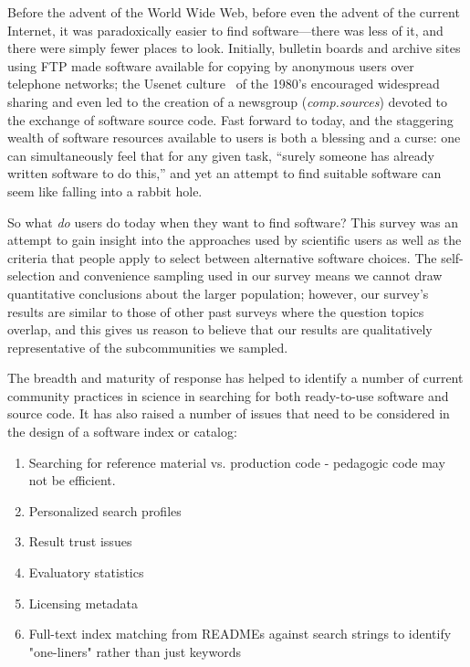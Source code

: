 \documentclass{casicswhitepaper}
\begin{document}
Before the advent of the World Wide Web, before even the advent of the current Internet, it was paradoxically easier to find software---there was less of it, and there were simply fewer places to look.  Initially, bulletin boards and archive sites using FTP made software available for copying by anonymous users over telephone networks; the Usenet culture~\cite{emerson1983usenet} of the 1980's encouraged widespread sharing and even led to the creation of a newsgroup (\emph{comp.sources}) devoted to the exchange of software source code.  Fast forward to today, and the staggering wealth of software resources available to users is both a blessing and a curse: one can simultaneously feel that for any given task, ``surely someone has already written software to do this,'' and yet an attempt to find suitable software can seem like falling into a rabbit hole.

%

So what \emph{do} users do today when they want to find software?  This survey was an attempt to gain insight into the approaches used by scientific users as well as the criteria that people apply to select between alternative software choices.  The self-selection and convenience sampling used in our survey means we cannot draw quantitative conclusions about the larger population; however, our survey's results are similar to those of other past surveys where the question topics overlap, and this gives us reason to believe that our results are qualitatively representative of the subcommunities we sampled.

The breadth and maturity of response has helped to identify a number of current community practices in science in searching for both ready-to-use software and source code. It has also raised a number of issues that need to be considered in the design of a software index or catalog:

\begin{enumerate}
\item Searching for reference material vs. production code - pedagogic code may not be efficient.
\item Personalized search profiles
\item Result trust issues
\item Evaluatory statistics 
\item Licensing metadata
\item Full-text index matching from READMEs against search strings to identify "one-liners" rather than just keywords
\end{enumerate}
\end{document}
